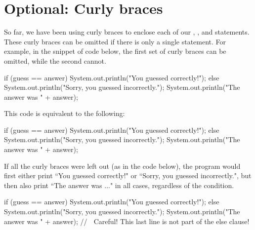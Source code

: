 


\section{Optional: Curly braces}
So far, we have been using curly braces to enclose each of our , , and  statements. These curly braces can be omitted if there is only a single statement. For example, in the snippet of code below, the first set of curly braces can be omitted, while the second cannot.

\begin{code}
if (guess == answer) 
{
    System.out.println("You guessed correctly!");
} 
else 
{
    System.out.println("Sorry, you guessed incorrectly.");
    System.out.println("The answer was " + answer);
} 
\end{code}

This code is equivalent to the following:

\begin{code}
if (guess == answer)
    System.out.println("You guessed correctly!");
else 
{
    System.out.println("Sorry, you guessed incorrectly.");
    System.out.println("The answer was " + answer);
} 
\end{code}

\noindent If all the curly braces were left out (as in the code below), the program would first either print ``You guessed correctly!" or ``Sorry, you guessed incorrectly.", but then also print ``The answer was ..." in all cases, regardless of the condition.

\begin{code}
if (guess == answer)
    System.out.println("You guessed correctly!");
else
    System.out.println("Sorry, you guessed incorrectly.");
    System.out.println("The answer was " + answer); 
    // ^^^ Careful! This last line is not part of the else clause!
\end{code}

